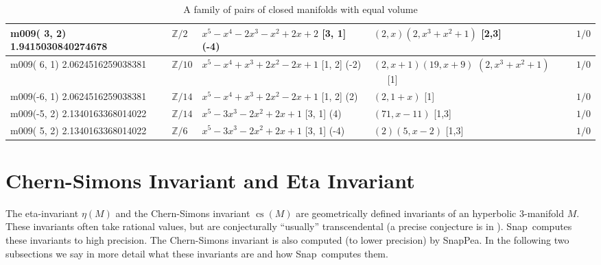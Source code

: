 \documentclass[a4paper]{amsart}
\def\Z{{\mathbb Z}}
\newcommand{\PreserveBackslash}[1]{\let\temp =\\#1\let\\=\temp}
\theoremstyle{definition}
\begin{document}
\begin{table}[h]
\begin{tabular}{|>{\PreserveBackslash\raggedright}p{3.2cm}|l| %
	>{\PreserveBackslash\raggedright}p{3.5cm}|
	>{\PreserveBackslash\raggedright}p{3.0cm}|l|}
\hline
m009( 3, 2) 
1.9415030840274678       &     $\Z/2$ &
\hbox{$x^5 - x^4 - 2x^3 - x^2 + 2x + 2$} 
[3, 1] (-4) &
\hbox{$(2,x) (2,x^3+x^2+1)$} [2,3]&
$1/0$ \\

\hline
m009( 6, 1)
2.0624516259038381       &      $\Z/10$ &
\hbox{$x^5 - x^4 + x^3 + 2x^2 - 2x + 1$} 
[1, 2] (-2) &
\hbox{$(2,x+1)  (19,x+9)$} {$(2,x^3+x^2+1)$}\ \ \  [1]&
$1/0$ \\

\hline
m009(-6, 1) 
2.0624516259038381       &    $\Z/14$ &
\hbox{$x^5 - x^4 + x^3 + 2x^2 - 2x + 1$} 
[1, 2] (2) &
\hbox{$(2,1+x)$} [1]&
$1/0$ \\

\hline
 m009(-5, 2)
2.1340163368014022       &     $\Z/14$ &
\hbox{$x^5 - 3x^3 - 2x^2 + 2x + 1$}
[3, 1] (4) &
\hbox{$(71,x-11)$} [1,3]&
$1/0$ \\
    

\hline
m009( 5, 2) 
2.1340163368014022      &        $\Z/6$ &
\hbox{$x^5 - 3x^3 - 2x^2 + 2x + 1$}
[3, 1] (-4) &
\hbox{$(2) (5,x-2)$} [1,3]&
$1/0$    \\

\hline

\end{tabular}
\caption{A family of pairs of closed manifolds with equal volume}
\label{twins}
\end{table}

\def\snap{{Snap}}\def\snappea{{SnapPea}}
\def\Bloch{\mathcal B}
\def\Prebloch{\mathcal P}
\def\CS{\operatorname{CS}}
\def\cs{\operatorname{cs}}
\def\vol{\operatorname{vol}}
\section{Chern-Simons Invariant and Eta Invariant}

The eta-invariant $\eta(M)$ and the Chern-Simons invariant $\cs(M)$
are geometrically defined invariants of an hyperbolic $3$-manifold
$M$.  These invariants often take rational values, but are
conjecturally ``usually'' transcendental (a precise conjecture is in
\cite{neumann-yang1}).  \snap\ computes these invariants to high
precision. The Chern-Simons invariant is also computed (to lower
precision) by \snappea.  In the following two subsections we say
in more detail what these invariants are and how \snap\ computes them.
\end{document}
